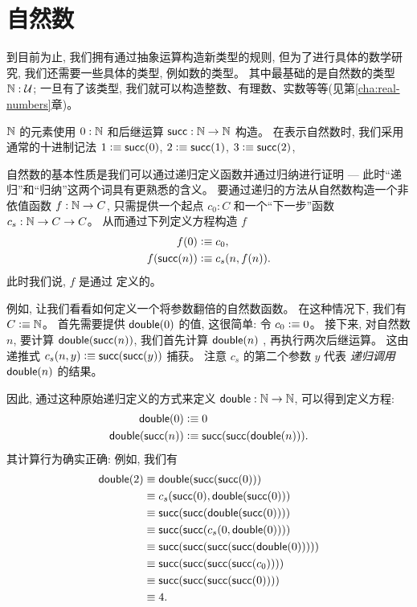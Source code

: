 \section{自然数}
\label{sec:inductive-types}

%
%
%

到目前为止, 我们拥有通过抽象运算构造新类型的规则, 但为了进行具体的数学研究, 我们还需要一些具体的类型, 例如数的类型。
其中最基础的是自然数的类型 $\mathbb{N} : \mathcal{U}$; 一旦有了该类型, 我们就可以构造整数、有理数、实数等等(见第\ref{cha:real-numbers}章)。

$\mathbb{N}$ 的元素使用 $0 : \mathbb{N}$ 和后继运算 $\mathsf{succ} : \mathbb{N} \to \mathbb{N}$ 构造。
在表示自然数时, 我们采用通常的十进制记法 $1 \vcentcolon\equiv \mathsf{succ}(0)$, $2 \vcentcolon\equiv \mathsf{succ}(1)$, $3 \vcentcolon\equiv \mathsf{succ}(2)$,

自然数的基本性质是我们可以通过递归定义函数并通过归纳进行证明 --- 此时``递归''和``归纳''这两个词具有更熟悉的含义。
%
要通过递归的方法从自然数构造一个非依值函数 $f : \mathbb{N} \to C$, 只需提供一个起点 $c_0 : C$ 和一个``下一步''函数 $c_s : \mathbb{N} \to C \to C$。
从而通过下列定义方程构造 $f$
\begin{align*}
  f(0) &\vcentcolon\equiv c_0, \\
  f(\mathsf{succ}(n)) &\vcentcolon\equiv c_s(n,f(n)).
\end{align*}
此时我们说, $f$ 是通过  定义的。
%
%

例如, 让我们看看如何定义一个将参数翻倍的自然数函数。
在这种情况下, 我们有 $C\vcentcolon\equiv \mathbb{N}$。
首先需要提供 $\mathsf{double}(0)$ 的值, 这很简单: 令 $c_0 \vcentcolon\equiv 0$。
接下来, 对自然数 $n$, 要计算 $\mathsf{double}(\mathsf{succ}(n))$, 我们首先计算 $\mathsf{double}(n)$ , 再执行两次后继运算。
这由递推式 $c_s(n,y) \vcentcolon\equiv \mathsf{succ}(\mathsf{succ}(y))$ 捕获。
注意 $c_s$ 的第二个参数 $y$ 代表 \emph{递归调用} $\mathsf{double}(n)$ 的结果。

因此, 通过这种原始递归定义的方式来定义 $\mathsf{double}:\mathbb{N}\to\mathbb{N}$, 可以得到定义方程:
\begin{align*}
  \mathsf{double}(0) &\vcentcolon\equiv 0\\
  \mathsf{double}(\mathsf{succ}(n)) &\vcentcolon\equiv \mathsf{succ}(\mathsf{succ}(\mathsf{double}(n))).
\end{align*}
其计算行为确实正确: 例如, 我们有
\begin{align*}
  \mathsf{double}(2) &\equiv \mathsf{double}(\mathsf{succ}(\mathsf{succ}(0)))\\
  & \equiv c_s(\mathsf{succ}(0), \mathsf{double}(\mathsf{succ}(0))) \\
                 & \equiv \mathsf{succ}(\mathsf{succ}(\mathsf{double}(\mathsf{succ}(0)))) \\
                 & \equiv \mathsf{succ}(\mathsf{succ}(c_s(0,\mathsf{double}(0)))) \\
                 & \equiv \mathsf{succ}(\mathsf{succ}(\mathsf{succ}(\mathsf{succ}(\mathsf{double}(0))))) \\
                 & \equiv \mathsf{succ}(\mathsf{succ}(\mathsf{succ}(\mathsf{succ}(c_0)))) \\
                 & \equiv \mathsf{succ}(\mathsf{succ}(\mathsf{succ}(\mathsf{succ}(0))))\\
                 &\equiv 4.
\end{align*}

